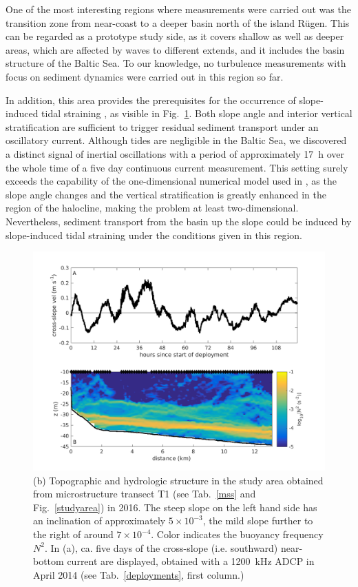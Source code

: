 One of the most interesting regions where measurements were carried out was the 
transition zone from near-coast to a deeper basin north of the island 
R\"{u}gen. This can be regarded as a prototype study side, as it covers shallow 
as well as deeper areas, which are affected by waves to different extends, and 
it includes the basin structure of the Baltic Sea. To our knowledge, 
no turbulence measurements with focus on sediment dynamics were carried out in 
this region so far.
 
In addition, this area provides the prerequisites for the occurrence of 
slope-induced tidal straining \citep[][]{UmlaufBurchard2011a, 
schulzumlauf2016}, as visible in Fig.\ \ref{abslope}. Both slope angle and 
interior vertical stratification are sufficient to trigger residual sediment 
transport under an oscillatory current. Although tides are negligible in the 
Baltic Sea, we discovered a distinct signal of inertial oscillations with a 
period of approximately 17~h over the whole time of a five day continuous 
current measurement. This setting surely exceeds the capability of the 
one-dimensional numerical model used in \cite{schulzumlauf2016}, as the slope 
angle changes and the vertical stratification is greatly enhanced in the 
region of the halocline, making the problem at least two-dimensional. 
Nevertheless, sediment transport from the basin up the slope could be induced 
by slope-induced tidal straining under the conditions given in this region.

 \begin{figure}[ht]
\includegraphics[width=40pc]{bilder/abslope.png}
 \caption{(b) Topographic and hydrologic structure in the study area 
obtained from microstructure transect T1 (see Tab.\ \ref{mss} and Fig.\ 
\ref{studyarea}) in 2016. The steep slope on the left hand side has an 
inclination of approximately $5 \times 10^{-3}$, the mild slope further to the 
right of around $7 \times 10^{-4}$. Color indicates the buoyancy frequency 
$N^2$. In (a), ca. five days of the cross-slope (i.e. southward) near-bottom 
current are displayed, obtained with a 1200~kHz ADCP in April 2014 (see Tab.\ 
\ref{deployments}, first column.)}
 \label{abslope}
 \end{figure}
 
